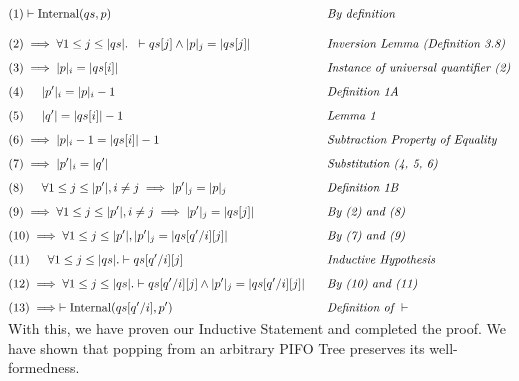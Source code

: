 \documentclass{article}
\begin{document}
\begin{alignat*}{5}
&(1) \vdash \text{Internal}(qs, p) && \hspace{0.3cm} \textit{By definition}\\[10pt]
&(2) \implies \forall 1 \leq j \leq |qs|. \hspace{0.2cm} \vdash qs[j] \land |p|_j = |qs[j]|&& \hspace{0.3cm} \textit{Inversion Lemma (Definition 3.8)}\\[5pt]
&(3) \implies |p|_i = |qs[i]|&& \hspace{0.3cm} \textit{Instance of universal quantifier (2)}\\[5pt]
&(4) \indent |p'|_i = |p|_i - 1&& \hspace{0.3cm} \textit{Definition 1A}\\[5pt]
&(5) \indent |q'| = |qs[i]| - 1&& \hspace{0.3cm} \textit{Lemma 1}\\[5pt]
&(6) \implies |p|_i - 1 = |qs[i]| - 1&& \hspace{0.3cm} \textit{Subtraction Property of Equality}\\[5pt]
&(7) \implies |p'|_i = |q'|&& \hspace{0.3cm} \textit{Substitution (4, 5, 6)}\\[5pt]
&(8) \indent \forall 1 \leq j \leq |p'|, i \neq j \implies |p'|_j = |p|_j&& \hspace{0.3cm} \textit{Definition 1B}\\[5pt]
&(9) \implies \forall 1 \leq j \leq |p'|, i \neq j \implies |p'|_j = |qs[j]|&& \hspace{0.3cm} \textit{By (2) and (8)}\\[5pt]
&(10) \implies \forall 1 \leq j \leq |p'|, |p'|_j = |qs[q' / i][j]|&& \hspace{0.3cm} \textit{By (7) and (9)}\\[5pt]
&(11)  \indent \forall 1 \leq j \leq |qs|. \vdash qs[q'/i][j]&& \hspace{0.3cm} \textit{Inductive Hypothesis}\\[5pt]
&(12) \implies \forall 1 \leq j \leq |qs|. \vdash qs[q'/i][j] \land |p'|_j = |qs[q'/i][j]|&&\hspace{0.3cm} \textit{By (10) and (11)}\\[5pt]
&(13) \implies \vdash \text{Internal}(qs[q'/i], p') && \hspace{0.3cm} \textit{Definition of } \vdash\\[-10pt]
\end{alignat*}

\noindent With this, we have proven our Inductive Statement and completed the proof. We have shown that popping from an arbitrary PIFO Tree preserves its well-formedness.\\[-10pt]
\end{document}
